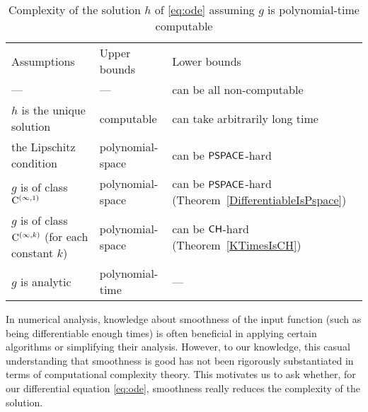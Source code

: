 \begin{table}
\renewcommand\arraystretch{1.3}
\begin{center}
 \caption{Complexity of the solution $h$ of \eqref{eq:ode}
 assuming $g$ is polynomial-time computable}
 \label{table:related}
\small\vspace{3pt}
 \begin{tabular}{lll}
  Assumptions & Upper bounds & Lower bounds \\
  \noalign{\smallskip}
  \hline
  \noalign{\smallskip}
   --- & --- & can be all non-computable \cite{pour1979computable} \\
  $h$ is the unique solution & computable \cite{coddington1955theory}
  & \parbox[t]{14em}{can take arbitrarily long time\\\cite{ko1983computational,miller1970recursive}} \\
  the Lipschitz condition  & polynomial-space \cite{ko1983computational}
      &	can be $\mathsf{PSPACE}$-hard \cite{kawamura2010lipschitz}\\
  $g$ is of class $\mathrm C ^{(\infty, 1)}$ & polynomial-space 
      & \parbox[t]{12em}{can be $\mathsf{PSPACE}$-hard\\(Theorem~\ref{DifferentiableIsPspace})} \\
  \parbox[t]{10.55em}{$g$ is of class $\mathrm C ^{(\infty, k)}$\\{}(for each constant $k$)}
  & polynomial-space 
  & can be $\mathsf{CH}$-hard (Theorem~\ref{KTimesIsCH}) \\
  $g$ is analytic
  & polynomial-time \cite{muller1987uniform,ko1988computing,kawamura2010complexity} 
  & ---
 \end{tabular}
\end{center}
\end{table}

In numerical analysis, 
knowledge about smoothness of the input function 
(such as being differentiable enough times) 
is often beneficial 
in applying certain algorithms or simplifying their analysis.
However, 
to our knowledge, 
this casual understanding that smoothness is good 
has not been rigorously substantiated 
in terms of computational complexity theory. 
This motivates us to ask whether, 
for our differential equation \eqref{eq:ode}, 
smoothness really reduces the complexity of the solution. 

